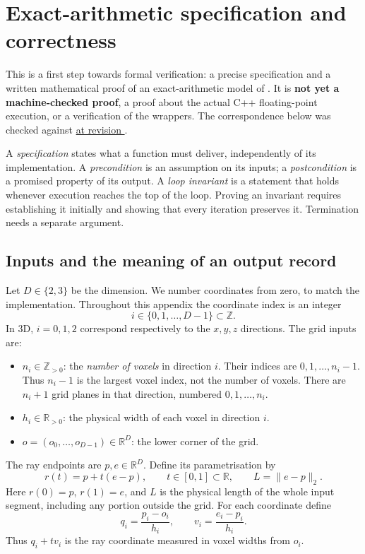 \section{Exact-arithmetic specification and correctness}
\label{app:exact}

This is a first step towards formal verification: a precise specification
and a written mathematical proof of an exact-arithmetic model of
. It is \textbf{not yet a machine-checked proof}, a proof about
the actual C++ floating-point execution, or a verification of the wrappers.
The correspondence below was checked against
\href{https://github.com/billlion/jacobsrays/blob/e1c4313550f86fd49547e7a9cb85f353d04f8a1d/include/jacobsrays/traverse.hpp}{ at revision }.

A \emph{specification} states what a function must deliver, independently
of its implementation. A \emph{precondition} is an assumption on its inputs;
a \emph{postcondition} is a promised property of its output. A \emph{loop
invariant} is a statement that holds whenever execution reaches the top of
the loop. Proving an invariant requires establishing it initially and showing
that every iteration preserves it. Termination needs a separate argument.

\subsection{Inputs and the meaning of an output record}
\label{app:exact-contract}
Let $D\in\{2,3\}$ be the dimension. We number coordinates from zero, to
match the implementation. Throughout this appendix the coordinate index is
an integer
\[
 i\in\{0,1,\ldots,D-1\}\subset\mathbb Z.
\]
In 3D, $i=0,1,2$ correspond respectively to the $x,y,z$ directions.
The grid inputs are:
\begin{itemize}
 \item $n_i\in\mathbb Z_{>0}$: the \emph{number of voxels} in direction $i$.
 Their indices are $0,1,\ldots,n_i-1$. Thus $n_i-1$ is the largest voxel
 index, not the number of voxels. There are $n_i+1$ grid planes in that
 direction, numbered $0,1,\ldots,n_i$.
 \item $h_i\in\mathbb R_{>0}$: the physical width of each voxel in direction $i$.
 \item $o=(o_0,\ldots,o_{D-1})\in\mathbb R^D$: the lower corner of the grid.
\end{itemize}
The ray endpoints are $p,e\in\mathbb R^D$. Define its parametrisation by
\[
 r(t)=p+t(e-p),\qquad t\in[0,1]\subset\mathbb R,
 \qquad L=\|e-p\|_2.
\]
Here $r(0)=p$, $r(1)=e$, and $L$ is the physical length of the whole input
segment, including any portion outside the grid. For each coordinate define
\[
 q_i=\frac{p_i-o_i}{h_i},\qquad v_i=\frac{e_i-p_i}{h_i}.
\]
Thus $q_i+t v_i$ is the ray coordinate measured in voxel widths from $o_i$.

